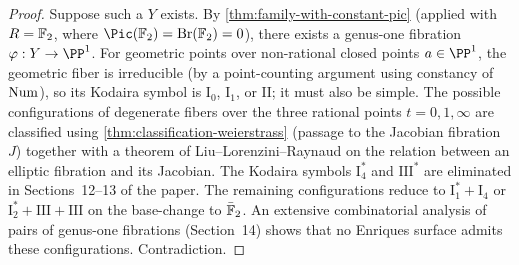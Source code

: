 \begin{proof}
  Suppose such a \(Y\) exists.
  By \cref{thm:family-with-constant-pic} (applied with \(R = \mathbb{F}_2\), where \(\Pic(\FF_2) = \Br(\FF_2) = 0\)),
  there exists a genus-one fibration \(\varphi : Y \to \PP^1\).
  For geometric points over non-rational closed points \(a \in \PP^1\), the geometric fiber is irreducible
  (by a point-counting argument using constancy of \(\mathrm{Num}\)), so its Kodaira symbol is \(\mathrm{I}_0\), \(\mathrm{I}_1\), or \(\mathrm{II}\);
  it must also be simple.
  The possible configurations of degenerate fibers over the three rational points \(t = 0, 1, \infty\)
  are classified using \cref{thm:classification-weierstrass} (passage to the Jacobian fibration \(J\))
  together with a theorem of Liu--Lorenzini--Raynaud on the relation between an elliptic fibration and its Jacobian.
  The Kodaira symbols \(\mathrm{I}_4^*\) and \(\mathrm{III}^*\) are eliminated in Sections~12--13 of the paper.
  The remaining configurations reduce to \(\mathrm{I}_1^* + \mathrm{I}_4\) or \(\mathrm{I}_2^* + \mathrm{III} + \mathrm{III}\)
  on the base-change to \(\bar{\mathbb{F}}_2\).
  An extensive combinatorial analysis of pairs of genus-one fibrations (Section~14) shows that no Enriques surface
  admits these configurations. Contradiction.
\end{proof}
